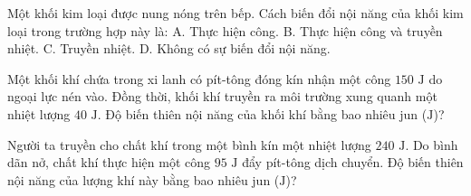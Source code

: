 



\begin{ex}
Một khối kim loại được nung nóng trên bếp. Cách biến đổi nội năng của khối kim loại trong trường hợp này là:
\choice
{A. Thực hiện công.}
{B. Thực hiện công và truyền nhiệt.}
{\True C. Truyền nhiệt.}
{D. Không có sự biến đổi nội năng.}
\end{ex}

\begin{ex}
Một khối khí chứa trong xi lanh có pít-tông đóng kín nhận một công $150\text{ J}$ do ngoại lực nén vào. Đồng thời, khối khí truyền ra môi trường xung quanh một nhiệt lượng $40\text{ J}$. Độ biến thiên nội năng của khối khí bằng bao nhiêu jun ($\text{J}$)?
\end{ex}

\begin{ex}
Người ta truyền cho chất khí trong một bình kín một nhiệt lượng $240\text{ J}$. Do bình dãn nở, chất khí thực hiện một công $95\text{ J}$ đẩy pít-tông dịch chuyển. Độ biến thiên nội năng của lượng khí này bằng bao nhiêu jun ($\text{J}$)?
\end{ex}

